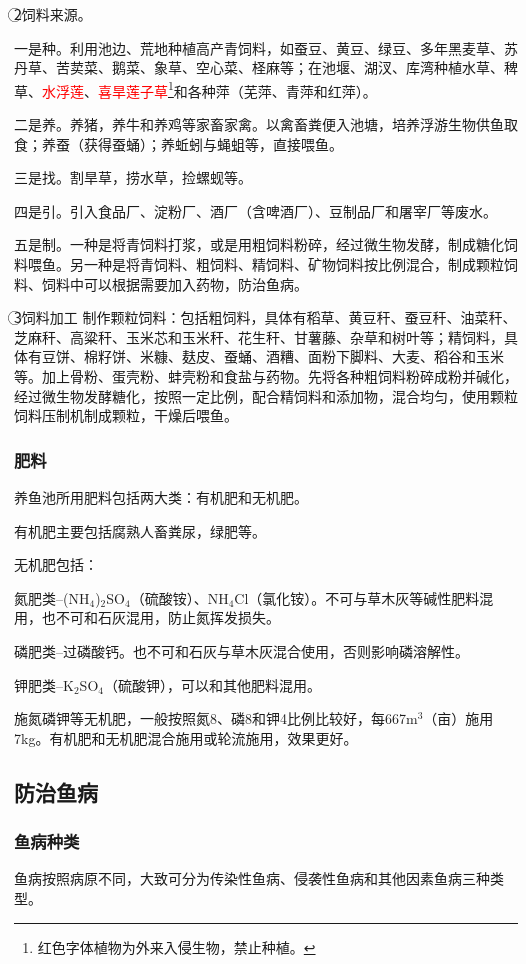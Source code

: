 \documentclass{ctexbook}
\begin{document}
\textcircled{2}饲料来源。

一是种。利用池边、荒地种植高产青饲料，如蚕豆、黄豆、绿豆、多年黑麦草、苏丹草、苦荬菜、鹅菜、象草、空心菜、柽麻等；在池堰、湖汊、库湾种植水草、稗草、\textcolor{red}{水浮莲}、\textcolor{red}{喜旱莲子草}\footnote{红色字体植物为外来入侵生物，禁止种植。}和各种萍（芜萍、青萍和红萍）。

二是养。养猪，养牛和养鸡等家畜家禽。以禽畜粪便入池塘，培养浮游生物供鱼取食；养蚕（获得蚕蛹）；养蚯蚓与蝇蛆等，直接喂鱼。

三是找。割旱草，捞水草，捡螺蚬等。

四是引。引入食品厂、淀粉厂、酒厂（含啤酒厂）、豆制品厂和屠宰厂等废水。

五是制。一种是将青饲料打浆，或是用粗饲料粉碎，经过微生物发酵，制成糖化饲料喂鱼。另一种是将青饲料、粗饲料、精饲料、矿物饲料按比例混合，制成颗粒饲料、饲料中可以根据需要加入药物，防治鱼病。

\textcircled{3}饲料加工
制作颗粒饲料：包括粗饲料，具体有稻草、黄豆秆、蚕豆秆、油菜秆、芝麻秆、高粱秆、玉米芯和玉米秆、花生秆、甘薯藤、杂草和树叶等；精饲料，具体有豆饼、棉籽饼、米糠、麸皮、蚕蛹、酒糟、面粉下脚料、大麦、稻谷和玉米等。加上骨粉、蛋壳粉、蚌壳粉和食盐与药物。先将各种粗饲料粉碎成粉并碱化，经过微生物发酵糖化，按照一定比例，配合精饲料和添加物，混合均匀，使用颗粒饲料压制机制成颗粒，干燥后喂鱼。
\subsubsection{肥料}
养鱼池所用肥料包括两大类：有机肥和无机肥。

有机肥主要包括腐熟人畜粪尿，绿肥等。

无机肥包括：

氮肥类--(NH$_4$)$_2$SO$_4$（硫酸铵）、NH$_4$Cl（氯化铵）。不可与草木灰等碱性肥料混用，也不可和石灰混用，防止氮挥发损失。

磷肥类--过磷酸钙。也不可和石灰与草木灰混合使用，否则影响磷溶解性。

钾肥类--K$_2$SO$_4$（硫酸钾），可以和其他肥料混用。

施氮磷钾等无机肥，一般按照氮8、磷8和钾4比例比较好，每667m$^{3}$（亩）施用7kg。有机肥和无机肥混合施用或轮流施用，效果更好。
\subsection{防治鱼病}
\subsubsection{鱼病种类}
鱼病按照病原不同，大致可分为传染性鱼病、侵袭性鱼病和其他因素鱼病三种类型。
\end{document}
